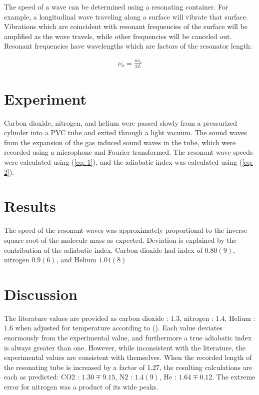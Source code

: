 \documentclass{article}
\begin{document}
The speed of a wave can be determined using a resonating container.  For example, a longitudinal wave traveling along a surface will vibrate that surface.  Vibrations which are coincident with resonant frequencies of the surface will be amplified as the wave travels, while other frequencies will be canceled out.  Resonant frequencies have wavelengths which are factors of the resonator length:

\begin{align}
    \nu_n = \frac{nv_s}{2L} \label{eq: 2}
\end{align}

\section{Experiment}

Carbon dioxide, nitrogen, and helium were passed slowly from a pressurized cylinder into a PVC tube and exited through a light vacuum.  The sound waves from the expansion of the gas induced sound waves in the tube, which were recorded using a microphone and Fourier transformed.  The resonant wave speeds were calculated using (\ref{eq: 1}), and the adiabatic index was calculated using (\ref{eq: 2}).

\section{Results}

The speed of the resonant waves was approximately proportional to the inverse square root of the molecule mass as expected.  Deviation is explained by the contribution of the adiabatic index.  Carbon dioxide had index of $0.80(9)$, nitrogen $0.9(6)$, and Helium $1.01(8)$

\section{Discussion}

The literature values are provided as carbon dioxide : $1.3$, nitrogen : $1.4$, Helium : $1.6$ when adjusted for temperature according to ().  Each value deviates enormously from the experimental value, and furthermore a true adiabatic index is always greater than one.  However, while inconsistent with the literature, the experimental values are consistent with themselves.  When the recorded length of the resonating tube is increased by a factor of 1.27, the resulting calculations are each as predicted: CO2 : $1.30 \mp 9.15$, N2 : $1.4 (9)$, He : $1.64 \mp 0.12$.  The extreme error for nitrogen was a product of its wide peaks.
\end{document}
